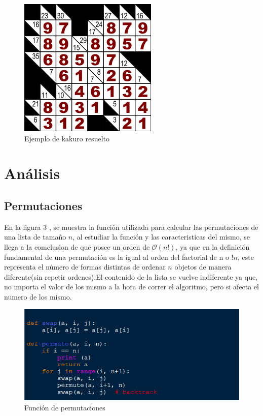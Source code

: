 \documentclass[journal]{IEEEtran}
\begin{document}
\begin{figure}[h] 
        \centering \includegraphics[width=.35\columnwidth]{kakuro_solved.png}
        \caption{
                \label{fig:samplesetup}
                Ejemplo de kakuro resuelto
        }
\end{figure}

\section{Análisis}
\subsection{Permutaciones}
En la figura 3
, se muestra la funci\'{o}n utilizada para calcular las permutaciones de una lista de tama\~{n}o $n$,  al estudiar la funci\'{o}n y las caracteristicas del mismo, se llega a la comclusion de que posee un orden de $\mathcal{O}(n!)$, ya que en la definici\'{o}n fundamental de una permutaci\'{o}n es la igual al orden del factorial de n o $!n$, este representa el número de formas distintas de ordenar $n$ objetos de manera diferente(sin repetir ordenes).El contenido de la lista se vuelve indiferente ya que, no importa el valor de los mismo a la hora de correr el algoritmo, pero si afecta el numero de los mismo.
\begin{figure}[hb] 
	\centering \includegraphics[width=0.9\columnwidth]{permutacion.png}
	\caption{
		\label{fig:samplesetup}
		Función de permutaciones 
	}
\end{figure} 
\end{document}
